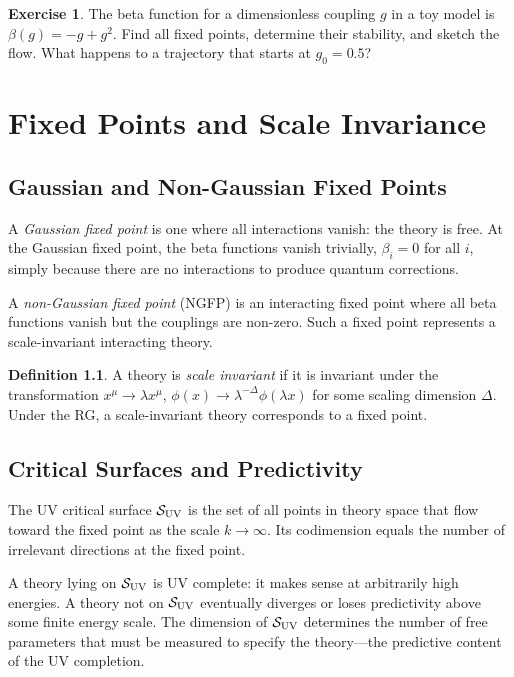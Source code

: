 \documentclass[12pt,a4paper,oneside]{book}
\theoremstyle{definition}
\newtheorem{definition}{Definition}[chapter]
\newtheorem{exercise}{Exercise}[chapter]
\theoremstyle{plain}
\theoremstyle{remark}
\begin{document}
\begin{exercise}
The beta function for a dimensionless coupling $g$ in a toy model is
$\beta(g) = -g + g^2$. Find all fixed points, determine their stability,
and sketch the flow. What happens to a trajectory that starts at $g_0 = 0.5$?
\end{exercise}

\chapter{Fixed Points and Scale Invariance}

\section{Gaussian and Non-Gaussian Fixed Points}

A \emph{Gaussian fixed point} is one where all interactions vanish: the theory
is free. At the Gaussian fixed point, the beta functions vanish trivially,
$\beta_i = 0$ for all $i$, simply because there are no interactions to produce
quantum corrections.

A \emph{non-Gaussian fixed point} (NGFP) is an interacting fixed point where
all beta functions vanish but the couplings are non-zero. Such a fixed point
represents a scale-invariant interacting theory.

\begin{definition}
A theory is \emph{scale invariant} if it is invariant under the transformation
$x^\mu \to \lambda x^\mu$, $\phi(x) \to \lambda^{-\Delta}\phi(\lambda x)$
for some scaling dimension $\Delta$. Under the RG, a scale-invariant theory
corresponds to a fixed point.
\end{definition}

\section{Critical Surfaces and Predictivity}

The UV critical surface $\mathcal{S}_{\rm UV}$ is the set of all points in theory
space that flow toward the fixed point as the scale $k \to \infty$. Its
codimension equals the number of irrelevant directions at the fixed point.

A theory lying on $\mathcal{S}_{\rm UV}$ is UV complete: it makes sense at
arbitrarily high energies. A theory not on $\mathcal{S}_{\rm UV}$ eventually
diverges or loses predictivity above some finite energy scale. The dimension
of $\mathcal{S}_{\rm UV}$ determines the number of free parameters that must
be measured to specify the theory---the predictive content of the UV completion.
\end{document}
